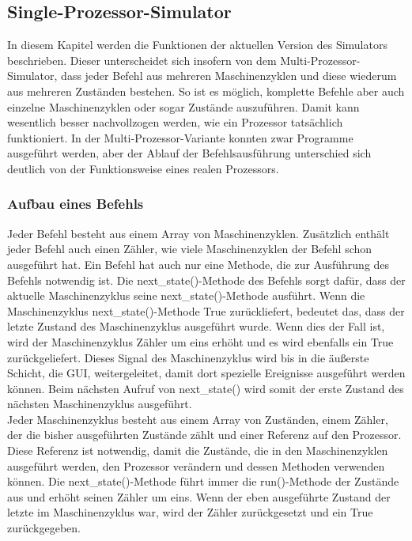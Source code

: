 \documentclass[12pt]{article}
\begin{document}
\subsection{Single-Prozessor-Simulator}
\label{SPS_impl}

\noindent
In diesem Kapitel werden die Funktionen der aktuellen Version des Simulators beschrieben. Dieser unterscheidet sich insofern von dem Multi-Prozessor-Simulator, dass jeder Befehl aus mehreren Maschinenzyklen und diese wiederum aus mehreren Zuständen bestehen. So ist es möglich, komplette Befehle aber auch einzelne Maschinenzyklen oder sogar Zustände auszuführen. Damit kann wesentlich besser nachvollzogen werden, wie ein Prozessor tatsächlich funktioniert. In der Multi-Prozessor-Variante konnten zwar Programme ausgeführt werden, aber der Ablauf der Befehlsausführung unterschied sich deutlich von der Funktionsweise eines realen Prozessors.

\subsubsection{Aufbau eines Befehls}

Jeder Befehl besteht aus einem Array von Maschinenzyklen. Zusätzlich enthält jeder Befehl auch einen Zähler, wie viele Maschinenzyklen der Befehl schon ausgeführt hat. Ein Befehl hat auch nur eine Methode, die zur Ausführung des Befehls notwendig ist. Die next\_state()-Methode des Befehls sorgt dafür, dass der aktuelle Maschinenzyklus seine next\_state()-Methode ausführt. Wenn die Maschinenzyklus next\_state()-Methode True zurückliefert, bedeutet das, dass der letzte Zustand des Maschinenzyklus ausgeführt wurde. Wenn dies der Fall ist, wird der Maschinenzyklus Zähler um eins erhöht und es wird ebenfalls ein True zurückgeliefert. Dieses Signal des Maschinenzyklus wird bis in die äußerste Schicht, die GUI, weitergeleitet, damit dort spezielle Ereignisse ausgeführt werden können. Beim nächsten Aufruf von next\_state() wird somit der erste Zustand des nächsten Maschinenzyklus ausgeführt.
\\

\noindent
Jeder Maschinenzyklus besteht aus einem Array von Zuständen, einem Zähler, der die bisher ausgeführten Zustände zählt und einer Referenz auf den Prozessor. Diese Referenz ist notwendig, damit die Zustände, die in den Maschinenzyklen ausgeführt werden, den Prozessor verändern und dessen Methoden verwenden können. Die next\_state()-Methode führt immer die run()-Methode der Zustände aus und erhöht seinen Zähler um eins. Wenn der eben ausgeführte Zustand der letzte im Maschinenzyklus war, wird der Zähler zurückgesetzt und ein True zurückgegeben.
\\
\end{document}
